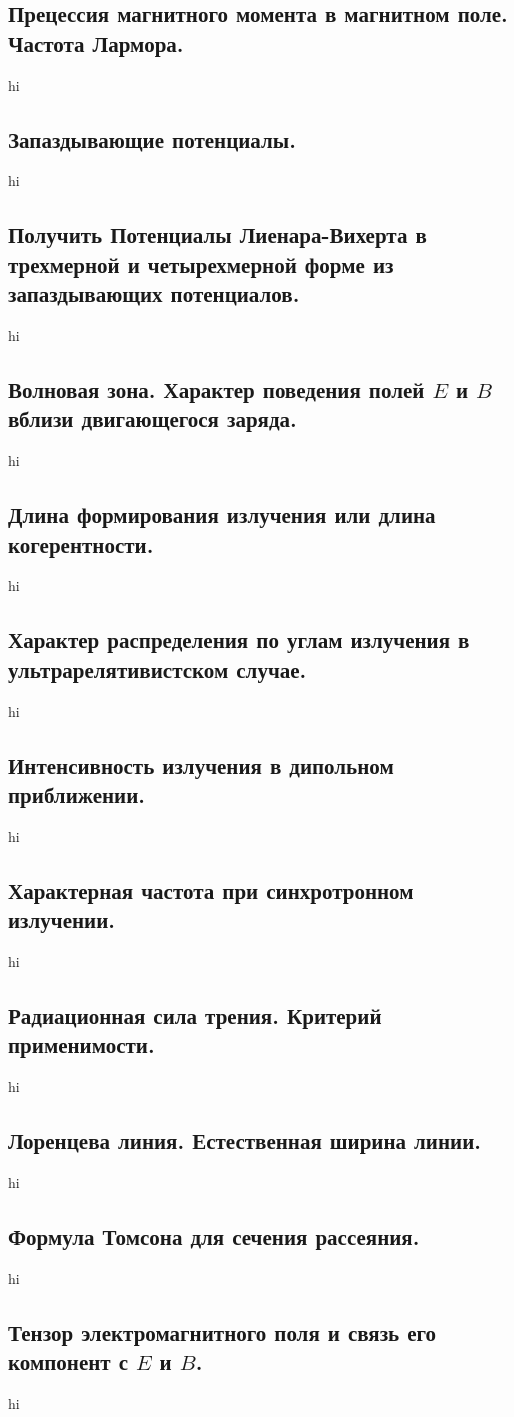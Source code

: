 \documentclass[a4paper,12pt]{article}
\begin{document}
\subsection{Прецессия магнитного момента в магнитном поле. Частота Лармора.}
hi
\subsection{Запаздывающие потенциалы.}
hi
\subsection{Получить Потенциалы Лиенара-Вихерта в трехмерной и четырехмерной
форме из запаздывающих потенциалов.}
hi
\subsection{Волновая зона. Характер поведения полей $E$ и $B$ вблизи
двигающегося заряда.}
hi
\subsection{Длина формирования излучения или длина когерентности.}
hi
\subsection{Характер распределения по углам излучения в ультрарелятивистском
случае.}
hi
\subsection{Интенсивность излучения в дипольном приближении.}
hi
\subsection{Характерная частота при синхротронном излучении.}
hi
\subsection{Радиационная сила трения. Критерий применимости.}
hi
\subsection{Лоренцева линия. Естественная ширина линии.}
hi
\subsection{Формула Томсона для сечения рассеяния.}
hi
\subsection{Тензор электромагнитного поля и связь его компонент с $E$ и $B$.}
hi
\end{document}
